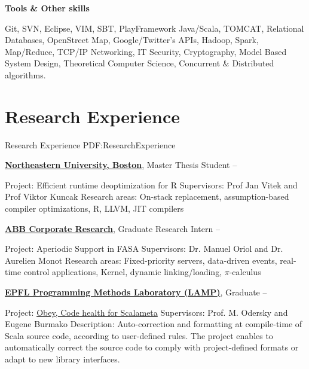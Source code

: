 \documentclass[a4paper,10pt,oneside]{article}
\begin{document}
\begin{body}
\EntryGap
\textbf{Tools \& Other skills}
\par
\begin{skilling}
Git, SVN, Eclipse, VIM, SBT, PlayFramework Java/Scala, TOMCAT,
Relational Databases, OpenStreet Map, Google/Twitter's APIs, Hadoop, Spark, Map/Reduce,
TCP/IP Networking, IT Security, Cryptography, Model Based System Design, Theoretical Computer Science,
Concurrent \& Distributed algorithms.
\end{skilling}

\hline

\section
{Research Experience}
{Research Experience}
{PDF:ResearchExperience}

\href{http://http://www.ccs.neu.edu/research/prl/}
{\textbf{Northeastern University, Boston}},
Master Thesis Student
\hfill
{} --
\begin{detail}
\BulletItem
Project:
Efficient runtime deoptimization for R 
\BulletItem
Supervisors:
Prof Jan Vitek and
Prof Viktor Kuncak
\BulletItem
Research areas:
On-stack replacement, assumption-based compiler optimizations, R, LLVM, JIT compilers
\end{detail}

\href{http://www.abb.com/}
{\textbf{ABB Corporate Research}},
Graduate Research Intern
\hfill
{} --
\begin{detail}
\BulletItem
Project:
Aperiodic Support in FASA
\BulletItem
Supervisors:
Dr. Manuel Oriol and
Dr. Aurelien Monot
\BulletItem
Research areas:
Fixed-priority servers, data-driven events, real-time control applications, Kernel, dynamic linking/loading, $\pi$-calculus 
\end{detail}

\EntryGap
\href{http://lamp.epfl.ch/}
{\textbf{EPFL Programming Methods Laboratory (LAMP)}},
Graduate
\hfill
{} --
\begin{detail}
\BulletItem
Project:
\href{http://infoscience.epfl.ch/record/204804?ln=en}
{Obey, Code health for Scalameta}
\BulletItem
Supervisors:
Prof. M. Odersky and 
Eugene Burmako
\BulletItem
Description:
Auto-correction and formatting at compile-time of Scala source code, according to user-defined rules.
The project enables to automatically correct the source code to comply with project-defined formats or adapt to new library interfaces.
\end{detail}


\end{body}
\end{document}

